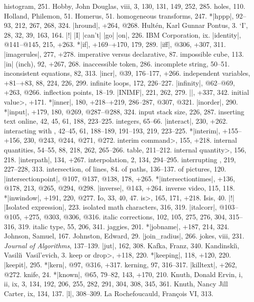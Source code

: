 histogram, 251.
Hobby, John Douglas, viii, 3, 130, 131, 149, 252, 285.
holes, 110.
Holland, Philemon, 51.
Homerus, 51.
homogeneous transforms, 247.
*|hppp|, 92--93, 212, 267, 268, 324.
|hround|, +264, @268.
Hult\'en, Karl Gunnar Pontus, 3.
\newletter
`I', 28, 32, 39, 163, 164.
|!| |I| |can't| |go| |on|, 226.
IBM Corporation, ix.
|identity|, @141--@145, 215, +263.
*|if|, +169--+170, 179, 289.
|iff|, @306, +307, 311.
|imagerules|, 277, +278.
imperative versus declarative, 87.
impossible cube, 113.
|in| (inch), 92, +267, 268.
inaccessible token, 286.
incomplete string, 50--51.
inconsistent equations, 82, 313.
|incr|, @39, 176--177, +266.
independent variables, +81--+83, 88, 224, 226, 299.
infinite loops, 172, 226--227.
|infinity|, @62--@69, +263, @266.
inflection points, 18--19.
|INIMF|, 221, 262, 279.
|\init|, +337, 342.
\<initial value>, +171.
*|inner|, 180, +218--+219, 286--287, @307, @321.
|inorder|, 290.
*|input|, +179, 180, @269, @287--@288, 324.
input stack size, 226, 287.
inserting text online, 42, 45, 61, 188, 223--225.
integers, 65--66.
|interact|, 230, +262.
interacting with \MF, 42--45, 61, 188--189, 191--193, 219, 223--225.
*|interim|, +155--+156, 230, @243, @244, @271, @272.
\<interim command>, 155, +218.
internal quantities, 54--55, 88, 218, 262, 265--266.
\sub table, 211--212.
\<internal quantity>, 156, 218.
|interpath|, 134, +267.
interpolation, 2, 134, 294--295.
interrupting \MF, 219, 227--228, 313.
intersection, of lines, 84.
\sub of paths, 136--137.
\sub of pictures, 120.
|intersectionpoint|, @107, @137, @138, 178, +265.
*|intersectiontimes|, +136, @178, 213, @265, @294, @298.
|inverse|, @143, +264.
inverse video, 115, 118.
*|inwindow|, +191, 220, @277.
Io, 33, 40, 47.
\<is>, 165, 171, +218.
Isis, 40.
|!| |Isolated expression|, 223.
isolated math characters, 316, 319.
|italcorr|, @103--@105, +275, @303, @306, @316.
italic corrections, 102, 105, 275, 276, 304, 315--316, 319.
italic type, 55, 206, 341.
\newletter
jaggies, 201.
*|jobname|, +187, 214, 324.
Johnson, Samuel, 167.
Johnston, Edward, 29.
|join_radius|, 266.
jokes, viii, 231.
{\sl Journal of Algorithms}, 137--139.
|jut|, 162, 308.
\newletter
Kafka, Franz, 340.
Kandinski\u\i, Vasili\u\i\ Vasil'evich, 3.
\<keep or drop>, +118, 220.
*|keeping|, 118, +120, 220.
|keepit|, 295.
*|kern|, @97, @316, +317.
kerning, 97, 316--317.
|killtext|, +262, @272.
knife, 24.
*|known|, @65, 79--82, 143, +170, 210.
Knuth, Donald Ervin, i, ii, ix, 3, 134, 192, 206, 255, 282, 291, 304, 308, 345,
 361.
Knuth, Nancy Jill Carter, ix, 134, 137.
\newletter
|l|, 308--309.
La Rochefoucauld, Fran\c cois VI, 313.
